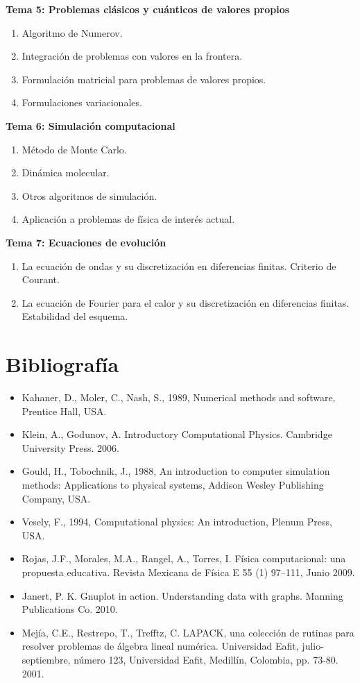 \documentclass[12pt]{article}
\begin{document}
\textbf{Tema 5: Problemas cl\'{a}sicos y cu\'{a}nticos de valores propios}
\begin{enumerate}
\item Algoritmo de Numerov.
\item Integraci\'{o}n de problemas con valores en la frontera.
\item Formulaci\'{o}n matricial para problemas de valores propios.
\item Formulaciones variacionales.
\end{enumerate}
\textbf{Tema 6: Simulaci\'{o}n computacional}
\begin{enumerate}
\item M\'{e}todo de Monte Carlo.
\item Din\'{a}mica molecular.
\item Otros algoritmos de simulaci\'{o}n.
\item Aplicaci\'{o}n a problemas de f\'{i}sica de inter\'{e}s actual.
\end{enumerate}
\textbf{Tema 7: Ecuaciones de evoluci\'{o}n}
\begin{enumerate}
\item La ecuaci\'{o}n de ondas y su discretizaci\'{o}n en diferencias finitas. Criterio de Courant.
\item La ecuaci\'{o}n de Fourier para el calor y su discretizaci\'{o}n en diferencias finitas. Estabilidad del esquema.
\end{enumerate}
\section{Bibliograf\'{i}a}
\begin{itemize}
\item Kahaner, D., Moler, C., Nash, S., 1989, Numerical methods and software, Prentice Hall, USA.
\item Klein, A., Godunov, A. Introductory Computational Physics. Cambridge University Press. 2006.
\item Gould, H., Tobochnik, J., 1988, An introduction to computer simulation methods: Applications to physical systems, Addison Wesley Publishing Company, USA.
\item Vesely, F., 1994, Computational physics: An introduction, Plenum Press, USA.
\item Rojas, J.F., Morales, M.A., Rangel, A., Torres, I. F\'{i}sica computacional: una propuesta educativa. Revista Mexicana de F\'{i}sica E 55 (1) 97–111, Junio 2009.
\item Janert, P. K. Gnuplot in action. Understanding data with graphs. Manning Publications Co. 2010.
\item Mej\'{i}a, C.E., Restrepo, T., Trefftz, C. LAPACK, una colecci\'{o}n de rutinas para resolver problemas de \'{a}lgebra lineal num\'{e}rica. Universidad Eafit, julio-septiembre, número 123, Universidad Eafit, Medill\'{i}n, Colombia, pp. 73-80. 2001.
\end{itemize}
\end{document}
